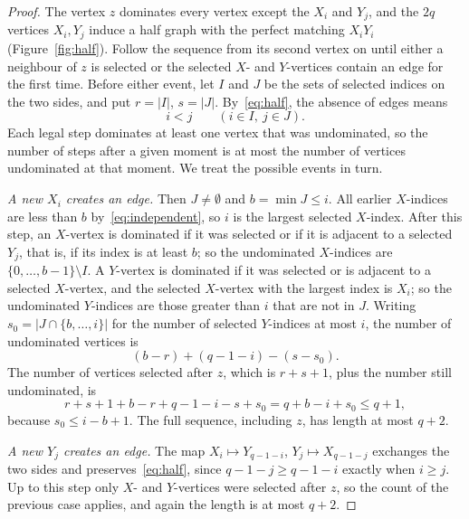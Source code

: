 \documentclass[11pt,a4paper,reqno]{amsart}
\theoremstyle{definition}
\theoremstyle{remark}
\numberwithin{equation}{section}
\begin{document}
\begin{proof}
The vertex $z$ dominates every vertex except the $X_i$ and $Y_j$, and the $2q$ vertices $X_i,Y_j$ induce a half graph with the perfect matching $X_iY_i$ (Figure~\ref{fig:half}). Follow the sequence from its second vertex on until either a neighbour of $z$ is selected or the selected $X$- and $Y$-vertices contain an edge for the first time. Before either event, let $I$ and $J$ be the sets of selected indices on the two sides, and put $r=|I|$, $s=|J|$. By~\eqref{eq:half}, the absence of edges means
\begin{equation}\label{eq:independent}
 i<j\qquad(i\in I,\ j\in J).
\end{equation}
Each legal step dominates at least one vertex that was undominated, so the number of steps after a given moment is at most the number of vertices undominated at that moment. We treat the possible events in turn.

\emph{A new $X_i$ creates an edge.} Then $J\ne\emptyset$ and $b=\min J\le i$. All earlier $X$-indices are less than $b$ by~\eqref{eq:independent}, so $i$ is the largest selected $X$-index. After this step, an $X$-vertex is dominated if it was selected or if it is adjacent to a selected $Y_j$, that is, if its index is at least $b$; so the undominated $X$-indices are $\{0,\dots,b-1\}\setminus I$. A $Y$-vertex is dominated if it was selected or is adjacent to a selected $X$-vertex, and the selected $X$-vertex with the largest index is $X_i$; so the undominated $Y$-indices are those greater than $i$ that are not in $J$. Writing $s_0=|J\cap\{b,\dots,i\}|$ for the number of selected $Y$-indices at most $i$, the number of undominated vertices is
\[
 (b-r)+(q-1-i)-(s-s_0).
\]
The number of vertices selected after $z$, which is $r+s+1$, plus the number still undominated, is
\[
r+s+1+b-r+q-1-i-s+s_0=q+b-i+s_0\le q+1,
\]
because $s_0\le i-b+1$. The full sequence, including $z$, has length at most $q+2$.

\emph{A new $Y_j$ creates an edge.} The map $X_i\mapsto Y_{q-1-i}$, $Y_j\mapsto X_{q-1-j}$ exchanges the two sides and preserves~\eqref{eq:half}, since $q-1-j\ge q-1-i$ exactly when $i\ge j$. Up to this step only $X$- and $Y$-vertices were selected after $z$, so the count of the previous case applies, and again the length is at most $q+2$.


\end{proof}
\end{document}
